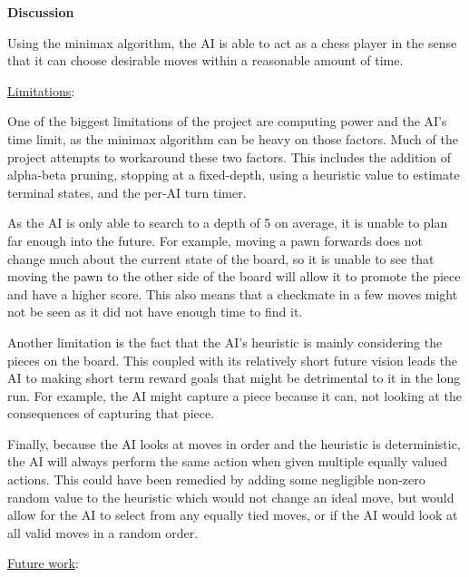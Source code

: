 \documentclass[12pt, letterpaper]{article}
\begin{document}
\clearpage

\textbf{Discussion}

\medskip

Using the minimax algorithm, the AI is able to act as a chess player in the sense that it can choose
desirable moves within a reasonable amount of time.

\medskip

\underline{Limitations}:

\medskip

One of the biggest limitations of the project are computing power and the AI's time limit, as the
minimax algorithm can be heavy on those factors. Much of the project attempts to workaround these two
factors. This includes the addition of alpha-beta pruning, stopping at a fixed-depth, using a heuristic
value to estimate terminal states, and the per-AI turn timer.

\medskip

As the AI is only able to search to a depth of 5 on average, it is unable to plan far enough into the
future. For example, moving a pawn forwards does not change much about the current state of the board,
so it is unable to see that moving the pawn to the other side of the board will allow it to promote the
piece and have a higher score. This also means that a checkmate in a few moves might not be seen as it
did not have enough time to find it.

\medskip

Another limitation is the fact that the AI's heuristic is mainly considering the pieces on the board.
This coupled with its relatively short future vision leads the AI to making short term reward goals
that might be detrimental to it in the long run. For example, the AI might capture a piece because it
can, not looking at the consequences of capturing that piece.

\medskip

Finally, because the AI looks at moves in order and the heuristic is deterministic, the AI will always
perform the same action when given multiple equally valued actions. This could have been remedied by
adding some negligible non-zero random value to the heuristic which would not change an ideal move,
but would allow for the AI to select from any equally tied moves, or if the AI would look at all
valid moves in a random order.

\medskip

\underline{Future work}:

\medskip
\end{document}

